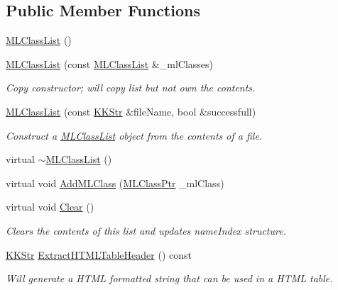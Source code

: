\subsection*{Public Member Functions}
\begin{DoxyCompactItemize}
\item 
\hyperlink{class_k_k_m_l_l_1_1_m_l_class_list_a8be14759dee3fb308c6809b3eca95a84}{M\+L\+Class\+List} ()
\item 
\hyperlink{class_k_k_m_l_l_1_1_m_l_class_list_a9eba66baab09be1d32fecab55467983e}{M\+L\+Class\+List} (const \hyperlink{class_k_k_m_l_l_1_1_m_l_class_list}{M\+L\+Class\+List} \&\+\_\+ml\+Classes)
\begin{DoxyCompactList}\small\item\em Copy constructor; will copy list but not own the contents. \end{DoxyCompactList}\item 
\hyperlink{class_k_k_m_l_l_1_1_m_l_class_list_a71f5b8e4566b4a85cbaca9e621dfcb39}{M\+L\+Class\+List} (const \hyperlink{class_k_k_b_1_1_k_k_str}{K\+K\+Str} \&file\+Name, bool \&successfull)
\begin{DoxyCompactList}\small\item\em Construct a \hyperlink{class_k_k_m_l_l_1_1_m_l_class_list}{M\+L\+Class\+List} object from the contents of a file. \end{DoxyCompactList}\item 
virtual \hyperlink{class_k_k_m_l_l_1_1_m_l_class_list_ad05849a325d48d98bfe09082b1e24ffd}{$\sim$\+M\+L\+Class\+List} ()
\item 
virtual void \hyperlink{class_k_k_m_l_l_1_1_m_l_class_list_a40d1967d45d8c2b571a5107480be8df7}{Add\+M\+L\+Class} (\hyperlink{namespace_k_k_m_l_l_ac272393853d59e72e8456f14cd6d8c23}{M\+L\+Class\+Ptr} \+\_\+ml\+Class)
\item 
virtual void \hyperlink{class_k_k_m_l_l_1_1_m_l_class_list_a0e4f16e9c738fc435a1110fa71c1cc54}{Clear} ()
\begin{DoxyCompactList}\small\item\em Clears the contents of this list and updates name\+Index structure. \end{DoxyCompactList}\item 
\hyperlink{class_k_k_b_1_1_k_k_str}{K\+K\+Str} \hyperlink{class_k_k_m_l_l_1_1_m_l_class_list_a9fdbe03268aed67b977f28a48a26a85e}{Extract\+H\+T\+M\+L\+Table\+Header} () const 
\begin{DoxyCompactList}\small\item\em Will generate a H\+T\+ML formatted string that can be used in a H\+T\+ML table. \end{DoxyCompactList}\item 

\end{DoxyCompactItemize}
